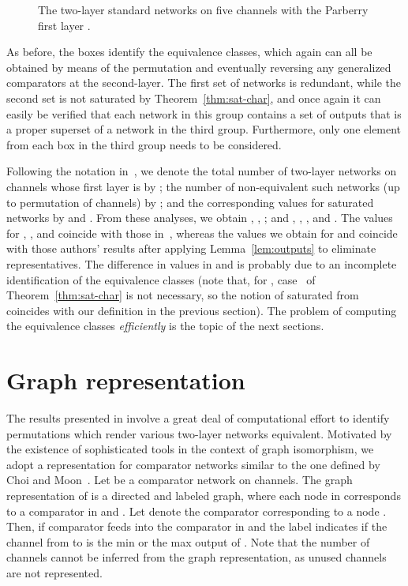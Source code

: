 \documentclass[10pt]{IEEEtran}
\begin{document}
{{\begin{figure}
\smallskip
{}

  \caption{The  two-layer standard networks on five channels with the Parberry first layer .}
  \label{fig:5wire}
\end{figure}

As before, the boxes identify the equivalence classes, which again can all be
obtained by means of the permutation  and eventually reversing any
generalized comparators at the second-layer.  The first set of networks is
redundant, while the second set is not saturated by Theorem~\ref{thm:sat-char},
and once again it can easily be verified that each network in this group
contains a set of outputs that is a proper superset of a network in the third
group.  Furthermore, only one element from each box in the third group needs to be
considered.

Following the notation in~\cite{DBLP:conf/lata/BundalaZ14}, we denote
the total number of two-layer networks on  channels whose first
layer is  by ; 
the number of non-equivalent such networks (up to permutation of
channels) by ; 
and the corresponding values for saturated networks by  and
.  
From these analyses, we obtain , ,
; and , , , and
.  The values for , ,  and 
coincide with those in~\cite{DBLP:conf/lata/BundalaZ14}, whereas the
values we obtain for  and  coincide with those authors'
results after applying Lemma~\ref{lem:outputs} to eliminate representatives.
The difference in values in  and
 is probably due to an incomplete identification of the
equivalence classes (note that, for , case~ of
Theorem~\ref{thm:sat-char} is not necessary, so the notion of
saturated from \cite{DBLP:conf/lata/BundalaZ14} coincides with our
definition in the previous section).  The problem of computing the
equivalence classes \emph{efficiently} is the topic of the next
sections.


\section{Graph representation}

The results presented in \cite{DBLP:conf/lata/BundalaZ14} involve a
great deal of computational effort to identify permutations which
render various two-layer networks equivalent. Motivated by the
existence of sophisticated tools in the context of graph isomorphism,
we adopt a representation for comparator networks similar to the one
defined by Choi and Moon~\cite{DBLP:conf/gecco/ChoiM02}.
Let  be a comparator network on  channels.  The graph
representation of  is a directed and labeled graph, 
where each node in  corresponds to a comparator in  and
.  Let  denote the
comparator corresponding to a node . Then,  if
comparator  feeds into the comparator  in  and the
label  indicates if the channel from  to
 is the min or the max output of .  Note that the
number of channels cannot be inferred from the graph representation,
as unused channels are not represented.

}}
\end{document}
